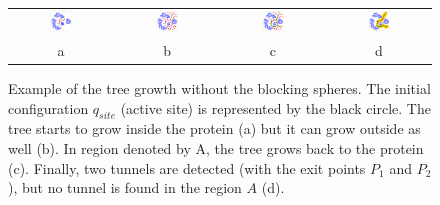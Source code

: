 \documentclass[usletter, 10pt, conference]{svjour3}      %
\def\qinit{q_{site}}
\begin{document}
\begin{figure}
\centering
{
\renewcommand{\tabcolsep}{1pt}
\begin{tabular}{cccc}
\includegraphics[width=0.24\textwidth]{fig/blockingb1} &
\includegraphics[width=0.24\textwidth]{fig/blockingb2} & 
\includegraphics[width=0.24\textwidth]{fig/blockingb3} & 
\includegraphics[width=0.24\textwidth]{fig/blockingb4} \\
a & b & c & d \\
\end{tabular}  
}
\caption{\label{fig::blocking1}
    Example of the tree growth without the blocking spheres. 
    The initial configuration $\qinit$ (active site) is represented by the black circle.
    The tree starts to grow inside the protein (a) but it can grow outside as well (b).
    In region denoted by A, the tree grows back to the protein (c).
    Finally, two tunnels are detected (with the exit points $P_1$ and $P_2$), but no tunnel is found in the region $A$ (d).
}
\end{figure}
\end{document}
